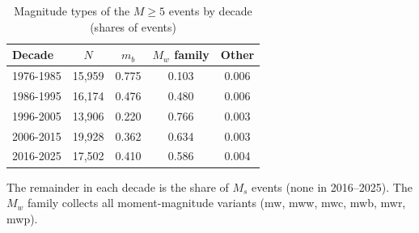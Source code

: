 \begin{table}[t]
\centering
\begin{threeparttable}
\caption{Magnitude types of the $M\geq 5$ events by decade (shares of events)}
\label{tab:magtype_mix}
\begin{tabular}{lcccc}
\toprule
Decade & $N$ & $m_b$ & $M_w$ family & Other \\
\midrule
1976-1985 & 15,959 & 0.775 & 0.103 & 0.006 \\
1986-1995 & 16,174 & 0.476 & 0.480 & 0.006 \\
1996-2005 & 13,906 & 0.220 & 0.766 & 0.003 \\
2006-2015 & 19,928 & 0.362 & 0.634 & 0.003 \\
2016-2025 & 17,502 & 0.410 & 0.586 & 0.004 \\
\bottomrule
\end{tabular}
\begin{tablenotes}[flushleft]
\footnotesize
\item The remainder in each decade is the share of $M_s$ events (none in 2016--2025). The $M_w$ family collects all moment-magnitude variants (mw, mww, mwc, mwb, mwr, mwp).
\end{tablenotes}
\end{threeparttable}
\end{table}
